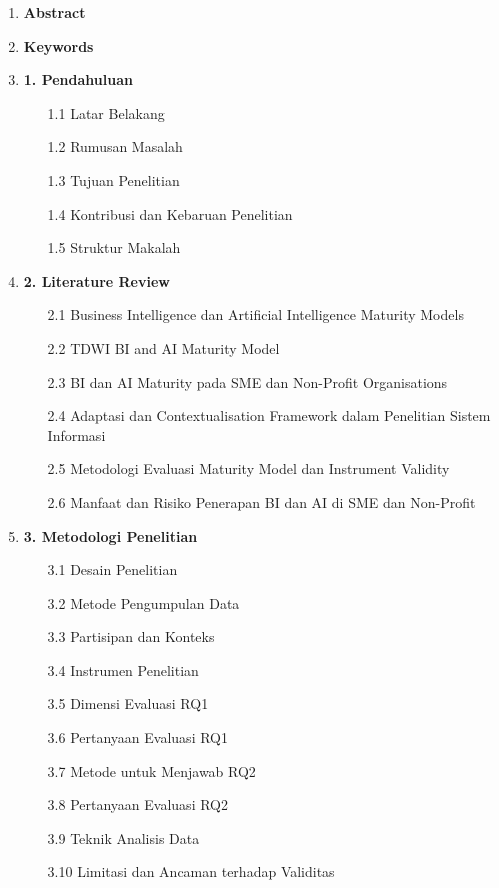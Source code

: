 \documentclass{article}
\begin{document}
\begin{enumerate}
	\item \textbf{Abstract}
	
	\item \textbf{Keywords}
	
	\item \textbf{1. Pendahuluan}
	\begin{enumerate}
		\item[1.1] Latar Belakang
		\item[1.2] Rumusan Masalah
		\item[1.3] Tujuan Penelitian
		\item[1.4] Kontribusi dan Kebaruan Penelitian
		\item[1.5] Struktur Makalah
	\end{enumerate}
	
	\item \textbf{2. Literature Review}
	\begin{enumerate}
		\item[2.1] Business Intelligence dan Artificial Intelligence Maturity Models
		\item[2.2] TDWI BI and AI Maturity Model
		\item[2.3] BI dan AI Maturity pada SME dan Non-Profit Organisations
		\item[2.4] Adaptasi dan Contextualisation Framework dalam Penelitian Sistem Informasi
		\item[2.5] Metodologi Evaluasi Maturity Model dan Instrument Validity
		\item[2.6] Manfaat dan Risiko Penerapan BI dan AI di SME dan Non-Profit
	\end{enumerate}
	
	\item \textbf{3. Metodologi Penelitian}
	\begin{enumerate}
		\item[3.1] Desain Penelitian
		\item[3.2] Metode Pengumpulan Data
		\item[3.3] Partisipan dan Konteks
		\item[3.4] Instrumen Penelitian
		\item[3.5] Dimensi Evaluasi RQ1
		\item[3.6] Pertanyaan Evaluasi RQ1
		\item[3.7] Metode untuk Menjawab RQ2
		\item[3.8] Pertanyaan Evaluasi RQ2
		\item[3.9] Teknik Analisis Data
		\item[3.10] Limitasi dan Ancaman terhadap Validitas
	\end{enumerate}
	

\end{enumerate}
\end{document}
